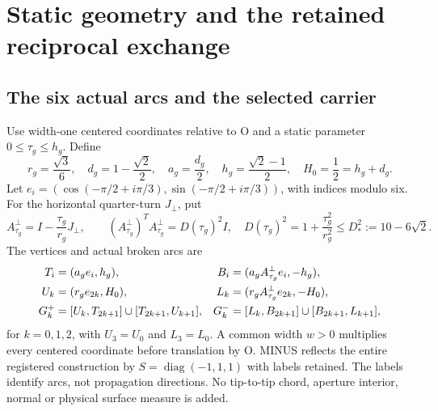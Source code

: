 \section{Static geometry and the retained reciprocal exchange}\label{sec:setting}
\subsection{The six actual arcs and the selected carrier}
Use width-one centered coordinates relative to O and a static parameter $0\le\tau_g\le h_g$. Define
\begin{equation}\label{eq:geomconstants}
r_g=\frac{\sqrt3}{6},\quad d_g=1-\frac{\sqrt2}{2},\quad
a_g=\frac{d_g}{2},\quad h_g=\frac{\sqrt2-1}{2},\quad H_0=\frac12=h_g+d_g.
\end{equation}
Let $e_i=(\cos(-\pi/2+i\pi/3),\sin(-\pi/2+i\pi/3))$, with indices modulo six. For the horizontal quarter-turn $J_\perp$, put
\begin{equation}\label{eq:horizmap}
A^\perp_{\tau_g}=I-\frac{\tau_g}{r_g}J_\perp,\qquad
(A^\perp_{\tau_g})^TA^\perp_{\tau_g}=D(\tau_g)^2I,
\quad D(\tau_g)^2=1+\frac{\tau_g^2}{r_g^2}\le D_*^2:=10-6\sqrt2.
\end{equation}
The vertices and actual broken arcs are~\cite{CCgeometry}
\begin{align}
T_i&=(a_ge_i,h_g),&B_i&=(a_gA^\perp_{\tau_g}e_i,-h_g),\notag\\
U_k&=(r_ge_{2k},H_0),&L_k&=(r_gA^\perp_{\tau_g}e_{2k},-H_0),\label{eq:vertices}\\
G_k^+&=[U_k,T_{2k+1}]\cup[T_{2k+1},U_{k+1}],&
G_k^-&=[L_k,B_{2k+1}]\cup[B_{2k+1},L_{k+1}],\label{eq:actualG}
\end{align}
for $k=0,1,2$, with $U_3=U_0$ and $L_3=L_0$. A common width $w>0$ multiplies every centered coordinate before translation by O. MINUS reflects the entire registered construction by $S=\operatorname{diag}(-1,1,1)$ with labels retained. The labels identify arcs, not propagation directions. No tip-to-tip chord, aperture interior, normal or physical surface measure is added.

